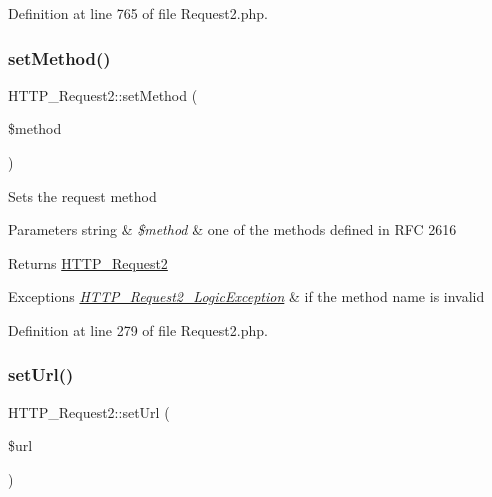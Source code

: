 Definition at line 765 of file Request2.\+php.

\hypertarget{classHTTP__Request2_a3372c369ddc092061cc15ff2f80a859f}{}\label{classHTTP__Request2_a3372c369ddc092061cc15ff2f80a859f} 
\subsubsection{\texorpdfstring{set\+Method()}{setMethod()}}
{\footnotesize\ttfamily H\+T\+T\+P\+\_\+\+Request2\+::set\+Method (\begin{DoxyParamCaption}\item[{}]{\$method }\end{DoxyParamCaption})}

Sets the request method


\begin{DoxyParams}[1]{Parameters}
string & {\em \$method} & one of the methods defined in R\+FC 2616\\
\hline
\end{DoxyParams}
\begin{DoxyReturn}{Returns}
\hyperlink{classHTTP__Request2}{H\+T\+T\+P\+\_\+\+Request2} 
\end{DoxyReturn}

\begin{DoxyExceptions}{Exceptions}
{\em \hyperlink{classHTTP__Request2__LogicException}{H\+T\+T\+P\+\_\+\+Request2\+\_\+\+Logic\+Exception}} & if the method name is invalid \\
\hline
\end{DoxyExceptions}


Definition at line 279 of file Request2.\+php.

\hypertarget{classHTTP__Request2_a323cb019d1cb621ec9419941d42130d1}{}\label{classHTTP__Request2_a323cb019d1cb621ec9419941d42130d1} 
\subsubsection{\texorpdfstring{set\+Url()}{setUrl()}}
{\footnotesize\ttfamily H\+T\+T\+P\+\_\+\+Request2\+::set\+Url (\begin{DoxyParamCaption}\item[{}]{\$url }\end{DoxyParamCaption})}

